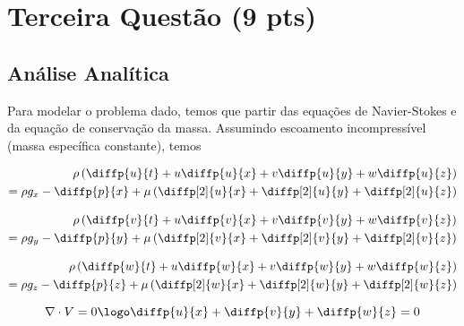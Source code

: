 
\section{Terceira Questão (9 pts)}

\subsection{Análise Analítica}


Para modelar o problema dado, temos que partir das equações de Navier-Stokes e 
da equação de conservação da massa. Assumindo escoamento incompressível (massa específica constante),
temos

\begin{equation}\label{eq:Q3NS1}
    \begin{split}
        \rho\left(\diffp{u}{t} + u\diffp{u}{x} + v\diffp{u}{y}+ w\diffp{u}{z}\right) \\
         = \rho g_x - \diffp{p}{x} + \mu \left(\diffp[2]{u}{x} + \diffp[2]{u}{y} + \diffp[2]{u}{z}\right)
    \end{split}
\end{equation}

\begin{equation}\label{eq:Q3NS2}
    \begin{split}
        \rho\left(\diffp{v}{t} + u\diffp{v}{x} + v\diffp{v}{y}+ w\diffp{v}{z}\right) \\
         = \rho g_y - \diffp{p}{y} + \mu \left(\diffp[2]{v}{x} + \diffp[2]{v}{y} + \diffp[2]{v}{z}\right)
    \end{split}
\end{equation}

\begin{equation}\label{eq:Q3NS3}
    \begin{split}
        \rho\left(\diffp{w}{t} + u\diffp{w}{x} + v\diffp{w}{y}+ w\diffp{w}{z}\right) \\
         = \rho g_z - \diffp{p}{z} + \mu \left(\diffp[2]{w}{x} + \diffp[2]{w}{y} + \diffp[2]{w}{z}\right)
    \end{split}
\end{equation}

\begin{equation}\label{eq:MassConservation}
    \nabla \cdot V = 0 \logo \diffp{u}{x} + \diffp{v}{y} + \diffp{w}{z} = 0
\end{equation}

